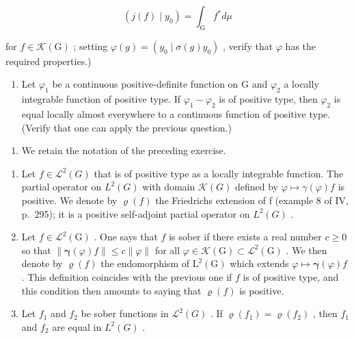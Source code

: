 \[
(j (f) \mid y _ {0}) = \int_ {\mathrm{G}} f ^ {*} d \mu
\]

for \(f \in \mathcal{K}(\mathrm{G})\) ; setting \(\varphi(g) = (y_0 \mid \sigma(g)y_0)\) , verify that \(\varphi\) has the required properties.)

\begin{enumerate}
\def\labelenumi{\alph{enumi})}
\setcounter{enumi}{5}
\tightlist
\item
  Let \(\varphi_{1}\) be a continuous positive-definite function on G and \(\varphi_{2}\) a locally integrable function of positive type. If \(\varphi_{1}-\varphi_{2}\) is of positive type, then \(\varphi_{2}\) is equal locally almost everywhere to a continuous function of positive type. (Verify that one can apply the previous question.)
\end{enumerate}

\begin{enumerate}
\def\labelenumi{\arabic{enumi})}
\setcounter{enumi}{20}
\tightlist
\item
  We retain the notation of the preceding exercise.
\end{enumerate}

\begin{enumerate}
\def\labelenumi{\alph{enumi})}
\item
  Let \(f \in \mathcal{L}^{2}(G)\) that is of positive type as a locally integrable function. The partial operator on \(L^{2}(G)\) with domain \(\mathcal{K}(G)\) defined by \(\varphi \mapsto \gamma(\varphi)f\) is positive. We denote by \(\varrho(f)\) the Friedrichs extension of f (example 8 of IV, p.~295); it is a positive self-adjoint partial operator on \(L^{2}(G)\) .
\item
  Let \(f \in \mathcal{L}^2(\mathrm{G})\) . One says that \(f\) is sober if there exists a real number \(c \geqslant 0\) so that \(\| \boldsymbol{\gamma}(\varphi)f \| \leqslant c \| \varphi \|\) for all \(\varphi \in \mathcal{K}(\mathrm{G}) \subset \mathcal{L}^2(\mathrm{G})\) . We then denote by \(\varrho(f)\) the endomorphism of \(\mathrm{L}^2(\mathrm{G})\) which extends \(\varphi \mapsto \boldsymbol{\gamma}(\varphi)f\) . This definition coincides with the previous one if \(f\) is of positive type, and this condition then amounts to saying that \(\varrho(f)\) is positive.
\item
  Let \(f_{1}\) and \(f_{2}\) be sober functions in \(\mathcal{L}^{2}(G)\) . If \(\varrho(f_{1}) = \varrho(f_{2})\) , then \(f_{1}\) and \(f_{2}\) are equal in \(L^{2}(G)\) .
\end{enumerate}

